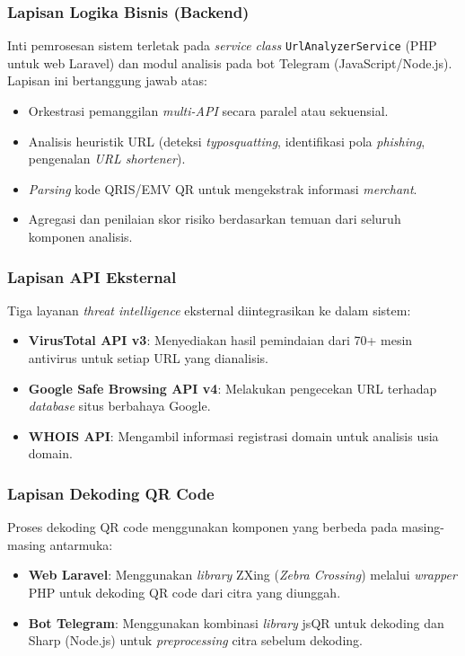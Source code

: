 \documentclass[conference]{IEEEtran}
\begin{document}
\subsubsection{Lapisan Logika Bisnis (Backend)}
Inti pemrosesan sistem terletak pada \textit{service class} \texttt{UrlAnalyzerService} (PHP untuk web Laravel) dan modul analisis pada bot Telegram (JavaScript/Node.js). Lapisan ini bertanggung jawab atas:

\begin{itemize}
    \item Orkestrasi pemanggilan \textit{multi-API} secara paralel atau sekuensial.
    \item Analisis heuristik URL (deteksi \textit{typosquatting}, identifikasi pola \textit{phishing}, pengenalan \textit{URL shortener}).
    \item \textit{Parsing} kode QRIS/EMV QR untuk mengekstrak informasi \textit{merchant}.
    \item Agregasi dan penilaian skor risiko berdasarkan temuan dari seluruh komponen analisis.
\end{itemize}

\subsubsection{Lapisan API Eksternal}
Tiga layanan \textit{threat intelligence} eksternal diintegrasikan ke dalam sistem:

\begin{itemize}
    \item \textbf{VirusTotal API v3}: Menyediakan hasil pemindaian dari 70+ mesin antivirus untuk setiap URL yang dianalisis.
    \item \textbf{Google Safe Browsing API v4}: Melakukan pengecekan URL terhadap \textit{database} situs berbahaya Google.
    \item \textbf{WHOIS API}: Mengambil informasi registrasi domain untuk analisis usia domain.
\end{itemize}

\subsubsection{Lapisan Dekoding QR Code}
Proses dekoding QR code menggunakan komponen yang berbeda pada masing-masing antarmuka:

\begin{itemize}
    \item \textbf{Web Laravel}: Menggunakan \textit{library} ZXing (\textit{Zebra Crossing}) melalui \textit{wrapper} PHP untuk dekoding QR code dari citra yang diunggah.
    \item \textbf{Bot Telegram}: Menggunakan kombinasi \textit{library} jsQR untuk dekoding dan Sharp (Node.js) untuk \textit{preprocessing} citra sebelum dekoding.
\end{itemize}
\end{document}
